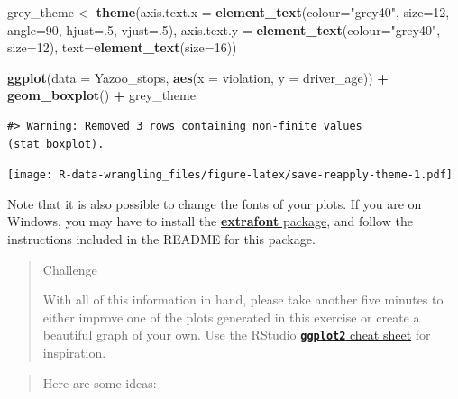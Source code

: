 \documentclass[]{book}
\newenvironment{Shaded}{\begin{snugshade}}{\end{snugshade}}
\newcommand{\DataTypeTok}[1]{\textcolor[rgb]{0.13,0.29,0.53}{#1}}
\newcommand{\DecValTok}[1]{\textcolor[rgb]{0.00,0.00,0.81}{#1}}
\newcommand{\KeywordTok}[1]{\textcolor[rgb]{0.13,0.29,0.53}{\textbf{#1}}}
\newcommand{\NormalTok}[1]{#1}
\newcommand{\OperatorTok}[1]{\textcolor[rgb]{0.81,0.36,0.00}{\textbf{#1}}}
\newcommand{\StringTok}[1]{\textcolor[rgb]{0.31,0.60,0.02}{#1}}
\begin{document}
\begin{Shaded}
\begin{Highlighting}[]
\NormalTok{grey_theme <-}\StringTok{ }\KeywordTok{theme}\NormalTok{(}\DataTypeTok{axis.text.x =} \KeywordTok{element_text}\NormalTok{(}\DataTypeTok{colour=}\StringTok{"grey40"}\NormalTok{, }\DataTypeTok{size=}\DecValTok{12}\NormalTok{, }\DataTypeTok{angle=}\DecValTok{90}\NormalTok{, }\DataTypeTok{hjust=}\NormalTok{.}\DecValTok{5}\NormalTok{, }\DataTypeTok{vjust=}\NormalTok{.}\DecValTok{5}\NormalTok{),}
                   \DataTypeTok{axis.text.y =} \KeywordTok{element_text}\NormalTok{(}\DataTypeTok{colour=}\StringTok{"grey40"}\NormalTok{, }\DataTypeTok{size=}\DecValTok{12}\NormalTok{), }\DataTypeTok{text=}\KeywordTok{element_text}\NormalTok{(}\DataTypeTok{size=}\DecValTok{16}\NormalTok{))}

\KeywordTok{ggplot}\NormalTok{(}\DataTypeTok{data =}\NormalTok{ Yazoo_stops, }\KeywordTok{aes}\NormalTok{(}\DataTypeTok{x =}\NormalTok{ violation, }\DataTypeTok{y =}\NormalTok{ driver_age)) }\OperatorTok{+}
\StringTok{  }\KeywordTok{geom_boxplot}\NormalTok{() }\OperatorTok{+}\StringTok{ }
\StringTok{  }\NormalTok{grey_theme}
\end{Highlighting}
\end{Shaded}

\begin{verbatim}
#> Warning: Removed 3 rows containing non-finite values (stat_boxplot).
\end{verbatim}

\texttt{[image: R-data-wrangling\_files/figure-latex/save-reapply-theme-1.pdf]}

Note that it is also possible to change the fonts of your plots. If you are on Windows, you may have to install the \href{https://github.com/wch/extrafont}{\textbf{extrafont} package}, and follow the instructions included in the README for this package.

\begin{quote}
Challenge

With all of this information in hand, please take another five minutes to either
improve one of the plots generated in this exercise or create a beautiful graph
of your own. Use the RStudio \href{https://www.rstudio.com/wp-content/uploads/2016/11/ggplot2-cheatsheet-2.1.pdf}{\textbf{\texttt{ggplot2}} cheat sheet} for
inspiration.
\end{quote}

\begin{quote}
Here are some ideas:
\end{quote}
\end{document}

